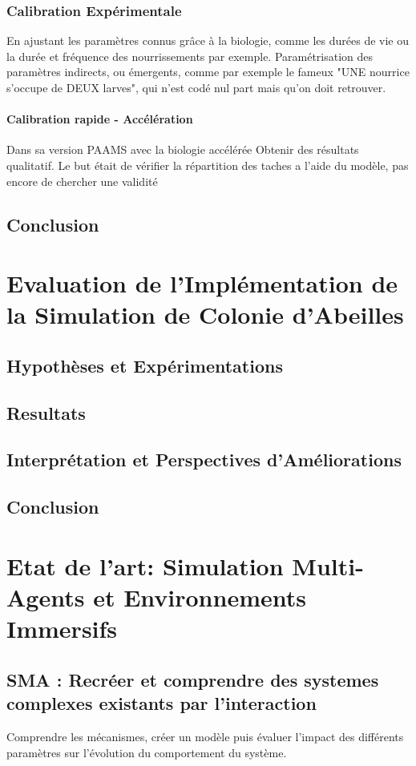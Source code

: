 \documentclass[11pt,a4paper]{report}
\begin{document}
		\subsection{Calibration Expérimentale}
			En ajustant les paramètres connus grâce à la biologie, comme les durées de vie ou la durée et fréquence des nourrissements par exemple.
			Paramétrisation des paramètres indirects, ou émergents, comme par exemple le fameux "UNE nourrice s'occupe de DEUX larves", qui n'est codé nul part mais qu'on doit retrouver.
	
		\subsubsection{Calibration rapide - Accélération}
			Dans sa version PAAMS avec la biologie accélérée
			Obtenir des résultats qualitatif. Le but était de vérifier la répartition des taches a l'aide du modèle, pas encore de chercher une validité
			
	\section*{Conclusion}
	
\chapter{Evaluation de l'Implémentation de la Simulation de Colonie d'Abeilles}
	\section{Hypothèses et Expérimentations}
	\section{Resultats}
	\section{Interprétation et Perspectives d'Améliorations}
			
	\section*{Conclusion}


\chapter{Etat de l'art: Simulation Multi-Agents et Environnements Immersifs}
	\section{SMA : Recréer et comprendre des systemes complexes existants par l'interaction}
		Comprendre les mécanismes, créer un modèle puis évaluer l'impact des différents paramètres sur l'évolution du comportement du système.
\end{document}
